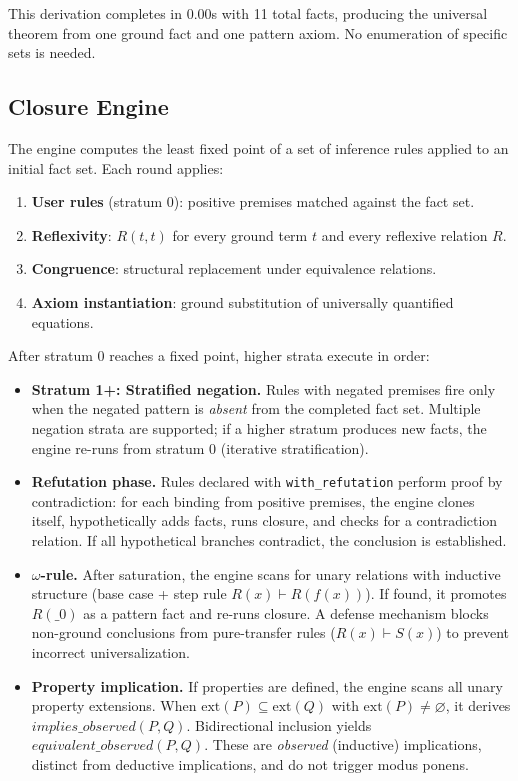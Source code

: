 \noindent This derivation completes in 0.00s with 11 total facts, producing the universal theorem from one ground fact and one pattern axiom. No enumeration of specific sets is needed.

\subsection{Closure Engine}

The engine computes the least fixed point of a set of inference rules applied to an initial fact set. Each round applies:

\begin{enumerate}
\item \textbf{User rules} (stratum 0): positive premises matched against the fact set.
\item \textbf{Reflexivity}: $R(t, t)$ for every ground term $t$ and every reflexive relation $R$.
\item \textbf{Congruence}: structural replacement under equivalence relations.
\item \textbf{Axiom instantiation}: ground substitution of universally quantified equations.
\end{enumerate}

After stratum 0 reaches a fixed point, higher strata execute in order:

\begin{itemize}
\item \textbf{Stratum 1+: Stratified negation.} Rules with negated premises fire only when the negated pattern is \emph{absent} from the completed fact set. Multiple negation strata are supported; if a higher stratum produces new facts, the engine re-runs from stratum 0 (iterative stratification).

\item \textbf{Refutation phase.} Rules declared with \texttt{with\_refutation} perform proof by contradiction: for each binding from positive premises, the engine clones itself, hypothetically adds facts, runs closure, and checks for a contradiction relation. If all hypothetical branches contradict, the conclusion is established.

\item \textbf{$\omega$-rule.} After saturation, the engine scans for unary relations with inductive structure (base case + step rule $R(x) \vdash R(f(x))$). If found, it promotes $R(\_0)$ as a pattern fact and re-runs closure. A defense mechanism blocks non-ground conclusions from pure-transfer rules ($R(x) \vdash S(x)$) to prevent incorrect universalization.

\item \textbf{Property implication.} If properties are defined, the engine scans all unary property extensions. When $\mathrm{ext}(P) \subseteq \mathrm{ext}(Q)$ with $\mathrm{ext}(P) \neq \varnothing$, it derives $\mathit{implies\_observed}(P, Q)$. Bidirectional inclusion yields $\mathit{equivalent\_observed}(P, Q)$. These are \emph{observed} (inductive) implications, distinct from deductive implications, and do not trigger modus ponens.
\end{itemize}

